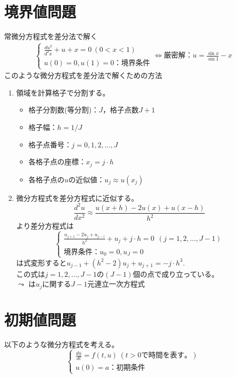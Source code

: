 \documentclass{jsreport}
\begin{document}
\section{境界値問題}
	常微分方程式を差分法で解く
\begin{align*}
\begin{cases}
	\frac{du^2}{d^2x}+ u+ x= 0\ (0< x <1)\\
	u(0)= 0, u(1)= 0：境界条件
\end{cases}
	\Longleftrightarrow
	厳密解：u= \frac{\sin{x}}{\sin{1}}- x
\end{align*}
	このような微分方程式を差分法で解くための方法
\begin{tcolorbox}[title= 差分法の計算手順]
\begin{enumerate}
	\item 領域を計算格子で分割する。
\begin{itemize}
	\item 格子分割数(等分割)：$J$，格子点数$J+ 1$
	\item 格子幅：$h= 1/J$
	\item 格子点番号：$j= 0, 1, 2, \ldots, J$
	\item 各格子点の座標：$x_j= j\cdot h$
	\item 各格子点の$u$の近似値：$u_j\approx u(x_j)$
\end{itemize}
	\item 微分方程式を差分方程式に近似する。
\begin{equation*}
	\frac{d^2 u}{dx^2}\approx \frac{u(x+ h)- 2u(x)+ u(x- h)}{h^2}
\end{equation*}
	より差分方程式は
\begin{equation} \label{eq:差分方程式}
\begin{cases}
	\frac{u_{j+ 1}- 2u_j+ u_{j- i}}{h^2}+ u_j+ j\cdot h= 0\ \ (j= 1, 2, \ldots, J- 1)\\
	境界条件：u_0= 0, u_J= 0
\end{cases}
\end{equation}
	は式変形すると$u_{j- 1}+ (h^ 2- 2)u_j+ u_{j+ 1}= -j\cdot h^3$. \\
	この式は$j= 1, 2, \ldots, J- 1$の$(J- 1)$個の点で成り立っている。\\
	$\leadsto$ は$u_j$に関する$J- 1$元連立一次方程式
\end{enumerate}
\end{tcolorbox}

\section{初期値問題}
	以下のような微分方程式を考える。
\begin{equation}
\begin{cases}
	\frac{du}{dt}= f(t, u)\ (t> 0で時間を表す。)\\
	u(0)= a：初期条件
\end{cases}
\end{equation}
\end{document}

